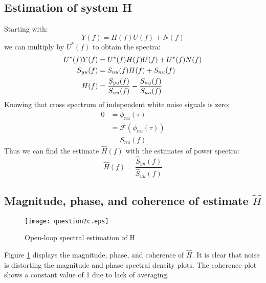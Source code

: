 \documentclass[11pt,a4paper]{article}
\begin{document}
\subsection{Estimation of system H}
Starting with:
\begin{equation*}
    Y(f) = H(f)U(f) + N(f)
\end{equation*}
we can multiply by $U^*(f)$ to obtain the spectra:
\begin{align}
    U^*(f)Y(f) &= U^*(f)H(f)U(f) + U^*(f)N(f) \notag\\
    S_{yu}(f) &= S_{uu}(f)H(f) + S_{nu}(f) \notag\\
    H(f) &= \frac{S_{yu}(f)}{S_{uu}(f)}  - \frac{S_{nu}(f)}{S_{uu}(f)}
    \label{eq:H}
\end{align}
Knowing that cross spectrum of independent white noise signals is zero:
\begin{align*}
    0 &= \phi_{nu}(\tau) \\
      &= \mathcal{F}(\phi_{nu}(\tau)) \\
      &= S_{nu}(f)
\end{align*}
Thus we can find the estimate $\hat{H}(f)$ with the estimates of power spectra:
\begin{equation}
    \hat{H}(f) = \frac{\hat{S}_{yu}(f)}{\hat{S}_{uu}(f)}
    \label{eq:H_est}
\end{equation}


\subsection{Magnitude, phase, and coherence of estimate $\hat{H}$}
\begin{figure}
    \begin{center}
        \texttt{[image: question2c.eps]}
    \end{center}
    \caption{Open-loop spectral estimation of H}
    \label{fig:2c}
\end{figure}
Figure \ref{fig:2c} displays the magnitude, phase, and coherence of $\hat{H}$.
It is clear that noise is distorting the magnitude and phase spectral density
plots. The coherence plot shows a constant value of 1 due to lack of averaging.

\end{document}
